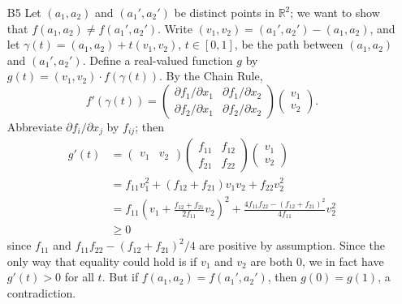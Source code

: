 \documentclass[amssymb,twocolumn,pra,10pt,aps]{revtex4-1}
\begin{document}
\begin{itemize}
\item[B5]
Let $(a_1,a_2)$ and $(a_1',a_2')$ be distinct points in $\mathbb{R}^2$; we want to show that $f(a_1,a_2) \neq f(a_1',a_2')$. Write $(v_1,v_2) = (a_1',a_2')-(a_1,a_2)$, and let $\gamma(t) = (a_1,a_2)+t(v_1,v_2)$, $t \in [0,1]$, be the path between $(a_1,a_2)$ and $(a_1',a_2')$. Define a real-valued function $g$ by $g(t) = (v_1,v_2) \cdot f(\gamma(t))$.
By the Chain Rule, 
\[
f'(\gamma(t)) = \left( \begin{matrix} \partial f_1/\partial x_1 & \partial f_1/\partial x_2 \\ \partial f_2/\partial x_1 & \partial f_2/\partial x_2 \end{matrix} \right) \left(
\begin{matrix} v_1 \\ v_2 \end{matrix} \right). 
\]
Abbreviate $\partial f_i/\partial x_j$ by $f_{ij}$; then
\begin{align*}
g'(t) &= \left( \begin{matrix} v_1 & v_2 \end{matrix} \right) \left( \begin{matrix} f_{11} & f_{12} \\ f_{21} & f_{22} \end{matrix} \right) \left( \begin{matrix} v_1 \\ v_2 \end{matrix} \right) \\
&= f_{11} v_1^2 + (f_{12}+f_{21})v_1v_2+f_{22} v_2^2 \\
&= f_{11} \left(v_1+\frac{f_{12}+f_{21}}{2f_{11}} v_2 \right)^2 + \frac{4f_{11}f_{22}-(f_{12}+f_{21})^2}{4f_{11}} v_2^2 \\
& \geq 0
\end{align*}
since $f_{11}$ and $f_{11}f_{22}-(f_{12}+f_{21})^2/4$ are positive by assumption. Since the only way that equality could hold is if $v_1$ and $v_2$ are both $0$, we in fact have $g'(t)>0$ for all $t$. But if $f(a_1,a_2) = f(a_1',a_2')$, then $g(0) = g(1)$, a contradiction.


\end{itemize}
\end{document}
